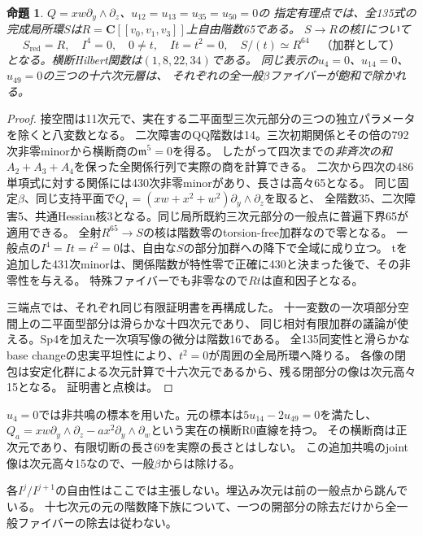 \documentclass[11pt,a4paper]{ltjsarticle}
\newcommand{\CC}{\mathbf C}
\newtheorem{proposition}[theorem]{命題}
\theoremstyle{remark}
\begin{document}
\begin{proposition}\label{prop:binary-drop-v37}
$Q=xw\partial_y\wedge\partial_z$、$u_{12}=u_{13}=u_{35}=u_{50}=0$の
指定有理点では、全135式の完成局所環$S$は$R=\CC[[v_0,v_1,v_3]]$上自由階数65である。
$S\to R$の核$I$について
\[
 S_{\mathrm{red}}=R,\quad I^4=0,\quad 0\ne t,\quad It=t^2=0,
 \quad S/(t)\simeq R^{64}\quad\text{（加群として）}
\]
となる。横断Hilbert関数は$(1,8,22,34)$である。
同じ表示の$u_4=0$、$u_{14}=0$、$u_{49}=0$の三つの十六次元層は、
それぞれの全一般$\beta$ファイバーが飽和で除かれる。
\end{proposition}
\begin{proof}
接空間は11次元で、実在する二平面型三次元部分の三つの独立パラメータを除くと八変数となる。
二次障害のQQ階数は14。三次初期関係とその倍の792次非零minorから横断商の$\mathfrak m^5=0$を得る。
したがって四次までの\emph{非斉次の和}$A_2+A_3+A_4$を保った全関係行列で実際の商を計算できる。
二次から四次の486単項式に対する関係には430次非零minorがあり、長さは高々65となる。
同じ固定$\beta$、同じ支持平面で$Q_1=(xw+x^2+w^2)\partial_y\wedge\partial_z$を取ると、
全階数35、二次障害5、共通Hessian核3となる。同じ局所既約三次元部分の一般点に普遍下界65が適用できる。
全射$R^{65}\to S$の核は階数零のtorsion-free加群なので零となる。
一般点の$I^4=It=t^2=0$は、自由な$S$の部分加群への降下で全域に成り立つ。
tを追加した431次minorは、関係階数が特性零で正確に430と決まった後で、その非零性を与える。
特殊ファイバーでも非零なので$Rt$は直和因子となる。

三端点では、それぞれ同じ有限証明書を再構成した。
十一変数の一次項部分空間上の二平面型部分は滑らかな十四次元であり、
同じ相対有限加群の議論が使える。Sp4を加えた一次項写像の微分は階数16である。
全135同変性と滑らかなbase changeの忠実平坦性により、$t^2=0$が周囲の全局所環へ降りる。
各像の閉包は安定化群による次元計算で十六次元であるから、残る閉部分の像は次元高々15となる。
証明書と点検は\cite{binary-drop-formal-v37,binary-endpoints-v37,binary-u4-v37}。
\end{proof}

$u_4=0$では非共鳴の標本を用いた。元の標本は$5u_{14}-2u_{49}=0$を満たし、
$Q_a=xw\partial_y\wedge\partial_z-a x^2\partial_y\wedge\partial_w$という実在の横断R0直線を持つ。
その横断商は正次元であり、有限切断の長さ69を実際の長さとはしない。
この追加共鳴のjoint像は次元高々15なので、一般$\beta$からは除ける。

各$I^j/I^{j+1}$の自由性はここでは主張しない。埋込み次元は前の一般点から跳んでいる。
十七次元の元の階数降下族について、一つの開部分の除去だけから全一般ファイバーの除去は従わない。
\end{document}
